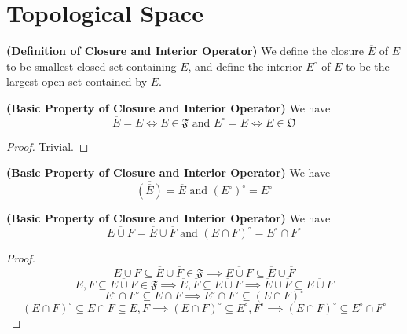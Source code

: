 \documentclass{report}
\begin{document}
\section{Topological Space}
\begin{definition}
\label{2.6.1}
\textbf{(Definition of Closure and Interior Operator)} We define the closure $\overline{E}$ of $E$ to be smallest closed set containing $E$, and define  the interior $E^\circ$ of  $E$ to be the largest open set contained by  $E$. 
\end{definition}
\begin{theorem}
\label{2.6.2}
\textbf{(Basic Property of Closure and Interior Operator)} We have
\begin{equation}
  \overline{E}=E\iff E\in\mathfrak{F}\text{ and }E^\circ=E\iff E\in\mathfrak{O}
\end{equation}
\end{theorem}
\begin{proof}
Trivial. 
\end{proof}
\begin{corollary}
\label{2.6.3}
\textbf{(Basic Property of Closure and Interior Operator)} We have
\begin{equation} \overline{(\overline{E})}=\overline{E}\text{ and }(E^\circ)^\circ=E^\circ
\end{equation}
\end{corollary}
\begin{theorem}
\label{2.6.4}
\textbf{(Basic Property of Closure and Interior Operator)} We have 
 \begin{equation}
   \overline{E\cup F}=\overline{E}\cup \overline{F}\text{ and }(E\cap F)^\circ=E^\circ \cap F^\circ
\end{equation}
\end{theorem}
\begin{proof}
\begin{equation}
E\cup F \subseteq \overline{E}\cup \overline{F}\in \mathfrak{F}\implies \overline{E\cup F}\subseteq \overline{E}\cup \overline{F}
\end{equation}
\begin{equation}
E,F\subseteq \overline{E\cup F}\in\mathfrak{F}\implies \overline{E},\overline{F}\subseteq \overline{E\cup F}\implies \overline{E}\cup \overline{F}\subseteq \overline{E\cup F}
\end{equation}
\begin{equation}
E^\circ \cap F^\circ \subseteq E\cap F \implies E^\circ \cap F^\circ \subseteq (E\cap F)^\circ 
\end{equation}
\begin{equation}
  (E\cap F)^\circ \subseteq E\cap F\subseteq E,F\implies (E\cap F)^\circ \subseteq E^\circ ,F^\circ \implies (E\cap F)^\circ \subseteq E^\circ \cap F^\circ 
\end{equation}
\end{proof}
\end{document}
